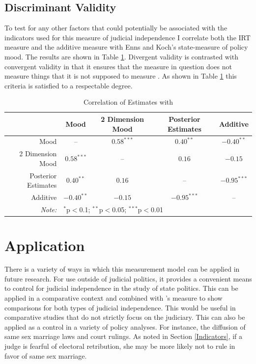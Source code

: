 \documentclass[12pt]{article}
\begin{document}
\subsection*{Discriminant Validity}
To test for any other factors that could potentially be associated with the indicators used for this measure of judicial independence I correlate both the IRT measure and the additive measure with Enns and Koch's \citeyearpar{Enns2013} state-measure of policy mood.  The results are shown in Table \ref{EKCor}.  Divergent validity is contrasted with convergent validity in that it ensures that the measure in question does not measure things that it is not supposed to measure \citep{Campbell1959,Jackman2008}.  As shown in Table \ref{EKCor} this criteria is satisfied to a respectable degree.

\begin{table}[ht]
	\centering\caption{Correlation of Estimates with \citet{Enns2013}}\label{EKCor}
	\begin{tabular}{rcccc}
		\hline
		&  Mood &  2 Dimension Mood & Posterior Estimates & Additive \\ 
		\hline
		Mood & -- & $0.58^{***}$ & $0.40^{**}$ & $-0.40^{**}$ \\ 
		2 Dimension Mood &  $0.58^{***}$ & -- & $0.16$ & $-0.15$ \\ 
		Posterior Estimates &  $0.40^{**}$  &  $0.16$  & -- & $-0.95^{***}$ \\ 
		Additive & $-0.40^{**}$  & $-0.15$  & $-0.95^{***}$ & -- \\ 
		\hline
		\textit{Note:}  & \multicolumn{4}{l}{$^{*}$p$<$0.1; $^{**}$p$<$0.05; $^{***}$p$<$0.01} \\
	\end{tabular}
\end{table}

\section{Application}\label{Application}
There is a variety of ways in which this measurement model can be applied in future research.  For use outside of judicial politics, it provides a convenient means to control for judicial independence in the study of state politics.  This can be applied in a comparative context and combined with \citet{Linzer2014}'s measure to show comparisons for both types of judicial independence.  This would be useful in comparative studies that do not strictly focus on the judiciary.  This can also be applied as a control in a variety of policy analyses.  For instance, the diffusion of same sex marriage laws and court rulings.  As noted in Section \ref{Indicators}, if a judge is fearful of electoral retribution, she may be more likely not to rule in favor of same sex marriage.  
\end{document}
